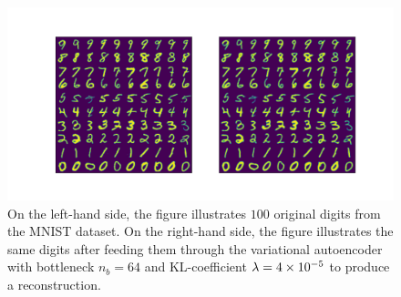 \begin{figure}
\begin{center}
      \includegraphics[trim = 15mm 10mm 15mm 15mm, clip, width=\linewidth]{convolutional_VAE_snd_KL_4e-5_10k_epochs_64D_inference}
\end{center}
\caption{On the left-hand side, the figure illustrates $100$ original digits from the MNIST dataset. On the right-hand side, the figure illustrates the same digits after feeding them through the variational autoencoder with bottleneck $n_b=64$ and KL-coefficient $\lambda = \num{4e-5}$ to produce a reconstruction.}\label{fig:convolutional_VAE_snd_KL_4e-5_10k_epochs_64D_inference}
\end{figure}


